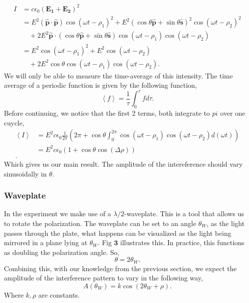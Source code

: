 \documentclass[working, oneside]{inputs/tuftebook}
\begin{document}
\begin{align*}
	I &= c\epsilon_0 \left( \bm{E_1} + \bm{E_2} \right)^2 \\
	&= E^2\left( \hat{\bm{p}}\cdot \hat{\bm{p}} \right)\cos\left( \omega t - \rho_1 \right)^2  + E^2\left( \cos\theta \bm{\hat{p}}+ \sin \theta \bm{\hat{s}} \right) ^2 \cos\left( \omega t -\rho_2 \right) ^2  \\
	& \quad + 2E^2 \bm{\hat{p}}\cdot \left(   \cos\theta \bm{\hat{p}}+ \sin \theta \bm{\hat{s}} \right)\cos\left( \omega t - \rho_1 \right) \cos\left( \omega t - \rho_2 \right) \\
	&= E^2 \cos\left( \omega t - \rho_1 \right) ^2 + E^2 \cos\left( \omega t - \rho_2 \right) \\
	&\quad + 2E^2\cos \theta\cos\left( \omega t - \rho_1 \right)\cos\left( \omega t - \rho_2 \right)  
.\end{align*}
We will only be able to measure the time-average of this intensity. The time average of a periodic function is given by the following function,
\[
\left< f \right> = \frac{1}{\tau} \int_{0}^{\tau} f d\tau  
.\]
Before continuing, we notice that the first 2 terms, both integrate to $pi$ over one cuycle,
\begin{align*}
	\left<I \right> &= E^2c\epsilon_0 \frac{1}{2\pi} \left( 2\pi + \cos\theta \int_{0}^{2\pi} \cos\left( \omega t - \rho_1 \right) \cos\left( \omega t - \rho _2 \right)  d\left( \omega t \right) \right) \\
	&= E^2c\epsilon_0 \left( 1 + \cos\theta \cos\left( \Delta \rho  \right)  \right)  \\
.\end{align*}
Which gives us our main result. The amplitude of the intereference should vary sinusoidally in $\theta $.
\subsubsection{Waveplate}
In the experiment we make use of a $\lambda /2$-waveplate. This is a tool that allows us to rotate the polarization. The waveplate can be set to an angle $\theta _W$, as the light  passes through the plate, what happens can be visualized as the light being mirrored in a plane lying at $\theta_W$. Fig $\bm{3}$ illustrates this. In practice, this functions as doubling the polarization angle. So,
\[
\theta = 2\theta_W
.\] 
Combining this, with our knowledge from the previous section, we expect the amplitude of the interference pattern to vary in the following way,
\[
A\left( \theta _W \right) = k \cos\left( 2\theta_W + \rho \right) 
.\] 
Where $k, \rho $ are constants.
\end{document}
